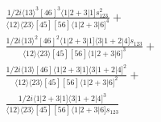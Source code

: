 \documentclass[varwidth, border=5pt]{standalone}
\begin{document}
\begin{my}
$\begin{gathered}
\scriptscriptstyle\frac{1/2i⟨13⟩^3[46]^3⟨1|2+3|1]s_{123}^2}{⟨12⟩⟨23⟩[45][56]⟨1|2+3|6]^4}+\\
\scriptscriptstyle\frac{1/2i⟨13⟩^2[46]^2⟨1|2+3|1]⟨3|1+2|4]s_{123}}{⟨12⟩⟨23⟩[45][56]⟨1|2+3|6]^3}+\\
\scriptscriptstyle\frac{1/2i⟨13⟩[46]⟨1|2+3|1]⟨3|1+2|4]^2}{⟨12⟩⟨23⟩[45][56]⟨1|2+3|6]^2}+\\
\scriptscriptstyle\frac{1/2i⟨1|2+3|1]⟨3|1+2|4]^3}{⟨12⟩⟨23⟩[45][56]⟨1|2+3|6]s_{123}}\phantom{+}
\end{gathered}$
\end{my}
\end{document}
